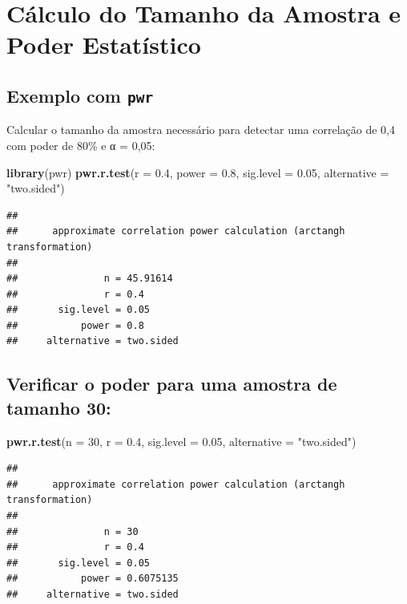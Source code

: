 \documentclass[
]{book}
\newenvironment{Shaded}{\begin{snugshade}}{\end{snugshade}}
\newcommand{\AttributeTok}[1]{\textcolor[rgb]{0.13,0.29,0.53}{#1}}
\newcommand{\DecValTok}[1]{\textcolor[rgb]{0.00,0.00,0.81}{#1}}
\newcommand{\FloatTok}[1]{\textcolor[rgb]{0.00,0.00,0.81}{#1}}
\newcommand{\FunctionTok}[1]{\textcolor[rgb]{0.13,0.29,0.53}{\textbf{#1}}}
\newcommand{\NormalTok}[1]{#1}
\newcommand{\StringTok}[1]{\textcolor[rgb]{0.31,0.60,0.02}{#1}}
\begin{document}
\section{Cálculo do Tamanho da Amostra e Poder Estatístico}\label{cuxe1lculo-do-tamanho-da-amostra-e-poder-estatuxedstico}

\subsection{\texorpdfstring{Exemplo com \texttt{pwr}}{Exemplo com pwr}}\label{exemplo-com-pwr}

Calcular o tamanho da amostra necessário para detectar uma correlação de 0,4 com poder de 80\% e α = 0,05:

\begin{Shaded}
\begin{Highlighting}[]
\FunctionTok{library}\NormalTok{(pwr)}
\FunctionTok{pwr.r.test}\NormalTok{(}\AttributeTok{r =} \FloatTok{0.4}\NormalTok{, }\AttributeTok{power =} \FloatTok{0.8}\NormalTok{, }\AttributeTok{sig.level =} \FloatTok{0.05}\NormalTok{, }\AttributeTok{alternative =} \StringTok{"two.sided"}\NormalTok{)}
\end{Highlighting}
\end{Shaded}

\begin{verbatim}
## 
##      approximate correlation power calculation (arctangh transformation) 
## 
##               n = 45.91614
##               r = 0.4
##       sig.level = 0.05
##           power = 0.8
##     alternative = two.sided
\end{verbatim}

\subsection{Verificar o poder para uma amostra de tamanho 30:}\label{verificar-o-poder-para-uma-amostra-de-tamanho-30}

\begin{Shaded}
\begin{Highlighting}[]
\FunctionTok{pwr.r.test}\NormalTok{(}\AttributeTok{n =} \DecValTok{30}\NormalTok{, }\AttributeTok{r =} \FloatTok{0.4}\NormalTok{, }\AttributeTok{sig.level =} \FloatTok{0.05}\NormalTok{, }\AttributeTok{alternative =} \StringTok{"two.sided"}\NormalTok{)}
\end{Highlighting}
\end{Shaded}

\begin{verbatim}
## 
##      approximate correlation power calculation (arctangh transformation) 
## 
##               n = 30
##               r = 0.4
##       sig.level = 0.05
##           power = 0.6075135
##     alternative = two.sided
\end{verbatim}
\end{document}
